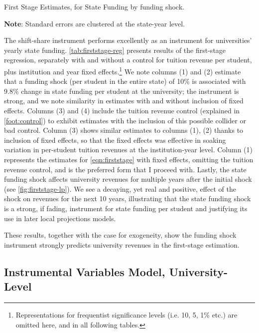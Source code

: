 \begin{table}[h!]
    \singlespacing
    \centering
    \caption{First Stage Estimates, for State Funding by funding shock.}
    \makebox[\textwidth][c]{}
    \label{tab:firststage-reg}
    \begin{flushleft}
        \footnotesize
        \textbf{Note}: Standard errors are clustered at the state-year level.
    \end{flushleft}
\end{table}

The shift-share instrument performs excellently as an instrument for universities' yearly state funding.
\autoref{tab:firststage-reg} presents results of the first-stage regression, separately with and without a control for tuition revenue per student, plus institution and year fixed effects.\footnote{
    Representations for frequentist significance levels (i.e. 10, 5, 1\% etc.) are omitted here, and in all following tables.
}
We note columns (1) and (2) estimate that a funding shock (per student in the entire state) of 10\% is associated with 9.8\% change in state funding per student at the university; the instrument is strong, and we note similarity in estimates with and without inclusion of fixed effects.
Columns (3) and (4) include the tuition revenue control (explained in \autoref{foot:control}) to exhibit estimates with the inclusion of this possible collider or bad control.
Column (3) shows similar estimates to columns (1), (2) thanks to inclusion of fixed effects, so that the fixed effects was effective in soaking variation in per-student tuition revenues at the institution-year level.
Column (1) represents the estimates for \autoref{eqn:firststage} with fixed effects, omitting the tuition revenue control, and is the preferred form that I proceed with.
Lastly, the state funding shock affects university revenues for multiple years after the initial shock (see \autoref{fig:firststage-lp}).
We see a decaying, yet real and positive, effect of the shock on revenues for the next 10 years, illustrating that the state funding shock is a strong, if fading, instrument for state funding per student and justifying its use in later local projections models.

These results, together with the case for exogeneity, show the funding shock instrument strongly predicts university revenues in the first-stage estimation.


\subsection{Instrumental Variables Model, University-Level}
\label{sec:iv-model-uni}

